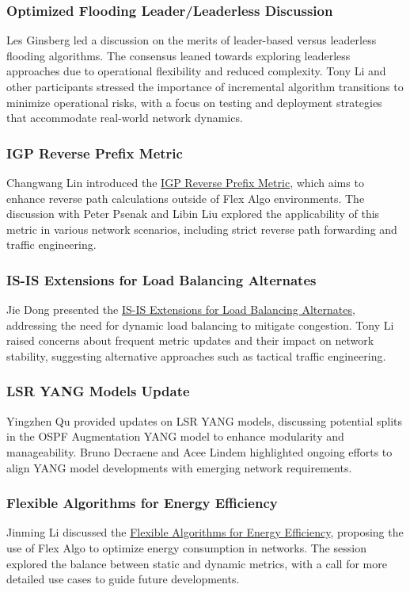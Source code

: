 \documentclass{article}
\begin{document}
\subsubsection{Optimized Flooding Leader/Leaderless Discussion}
Les Ginsberg led a discussion on the merits of leader-based versus leaderless flooding algorithms. The consensus leaned towards exploring leaderless approaches due to operational flexibility and reduced complexity. Tony Li and other participants stressed the importance of incremental algorithm transitions to minimize operational risks, with a focus on testing and deployment strategies that accommodate real-world network dynamics.

\subsubsection{IGP Reverse Prefix Metric}
Changwang Lin introduced the \href{https://datatracker.ietf.org/doc/draft-li-lsr-igp-reverse-prefix-metric/}{IGP Reverse Prefix Metric}, which aims to enhance reverse path calculations outside of Flex Algo environments. The discussion with Peter Psenak and Libin Liu explored the applicability of this metric in various network scenarios, including strict reverse path forwarding and traffic engineering.

\subsubsection{IS-IS Extensions for Load Balancing Alternates}
Jie Dong presented the \href{https://datatracker.ietf.org/doc/html/draft-dong-lsr-load-balancing-alternate-00}{IS-IS Extensions for Load Balancing Alternates}, addressing the need for dynamic load balancing to mitigate congestion. Tony Li raised concerns about frequent metric updates and their impact on network stability, suggesting alternative approaches such as tactical traffic engineering.

\subsubsection{LSR YANG Models Update}
Yingzhen Qu provided updates on LSR YANG models, discussing potential splits in the OSPF Augmentation YANG model to enhance modularity and manageability. Bruno Decraene and Acee Lindem highlighted ongoing efforts to align YANG model developments with emerging network requirements.

\subsubsection{Flexible Algorithms for Energy Efficiency}
Jinming Li discussed the \href{https://datatracker.ietf.org/doc/draft-li-lsr-flex-algo-energy-efficiency/}{Flexible Algorithms for Energy Efficiency}, proposing the use of Flex Algo to optimize energy consumption in networks. The session explored the balance between static and dynamic metrics, with a call for more detailed use cases to guide future developments.
\end{document}
